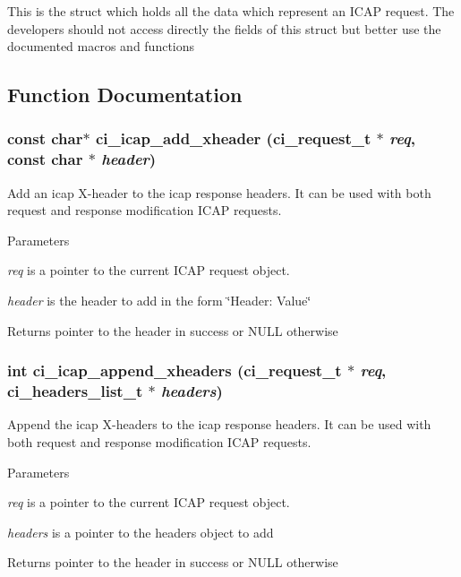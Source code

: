 This is the struct which holds all the data which represent an ICAP request. The developers should not access directly the fields of this struct but better use the documented macros and functions 

\subsection{Function Documentation}
\hypertarget{group__REQUEST_ga94393b6b41ccfb7b65c42e2eaff89791}{
\subsubsection[{ci\_\-icap\_\-add\_\-xheader}]{\setlength{\rightskip}{0pt plus 5cm}const char$\ast$ ci\_\-icap\_\-add\_\-xheader ({\bf ci\_\-request\_\-t} $\ast$ {\em req}, \/  const char $\ast$ {\em header})}}
\label{group__REQUEST_ga94393b6b41ccfb7b65c42e2eaff89791}


Add an icap X-\/header to the icap response headers. It can be used with both request and response modification ICAP requests. 
\begin{DoxyParams}{Parameters}
\item[{\em req}]is a pointer to the current ICAP request object. \item[{\em header}]is the header to add in the form \char`\"{}Header: Value\char`\"{} \end{DoxyParams}
\begin{DoxyReturn}{Returns}
pointer to the header in success or NULL otherwise 
\end{DoxyReturn}
\hypertarget{group__REQUEST_gab3bc00aa780fa6899d5046f964a31f39}{
\subsubsection[{ci\_\-icap\_\-append\_\-xheaders}]{\setlength{\rightskip}{0pt plus 5cm}int ci\_\-icap\_\-append\_\-xheaders ({\bf ci\_\-request\_\-t} $\ast$ {\em req}, \/  {\bf ci\_\-headers\_\-list\_\-t} $\ast$ {\em headers})}}
\label{group__REQUEST_gab3bc00aa780fa6899d5046f964a31f39}


Append the icap X-\/headers to the icap response headers. It can be used with both request and response modification ICAP requests. 
\begin{DoxyParams}{Parameters}
\item[{\em req}]is a pointer to the current ICAP request object. \item[{\em headers}]is a pointer to the headers object to add \end{DoxyParams}
\begin{DoxyReturn}{Returns}
pointer to the header in success or NULL otherwise 
\end{DoxyReturn}
